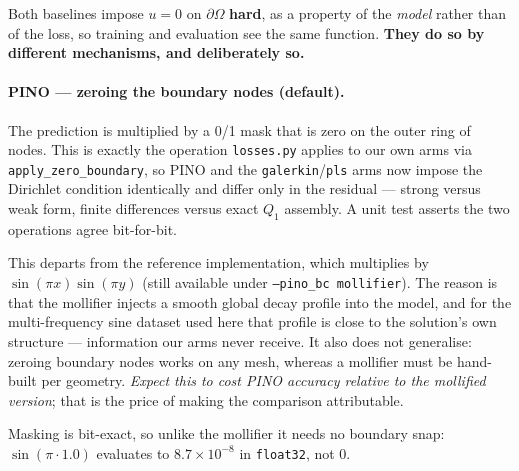 \documentclass[11pt]{article}
\begin{document}
Both baselines impose $u=0$ on $\partial\Omega$ \textbf{hard}, as a property of the \emph{model}
rather than of the loss, so training and evaluation see the same function. \textbf{They do so by
different mechanisms, and deliberately so.}

\paragraph{PINO --- zeroing the boundary nodes (default).} The prediction is multiplied by a
0/1 mask that is zero on the outer ring of nodes. This is exactly the operation
\texttt{losses.py} applies to our own arms via \texttt{apply\_zero\_boundary}, so PINO and the
\texttt{galerkin}/\texttt{pls} arms now impose the Dirichlet condition identically and differ only
in the residual --- strong versus weak form, finite differences versus exact $Q_1$ assembly.
A unit test asserts the two operations agree bit-for-bit.

This departs from the reference implementation, which multiplies by
$\sin(\pi x)\sin(\pi y)$ (still available under \texttt{--pino\_bc mollifier}). The reason is that
the mollifier injects a smooth global decay profile into the model, and for the multi-frequency
sine dataset used here that profile is close to the solution's own structure --- information our
arms never receive. It also does not generalise: zeroing boundary nodes works on any mesh, whereas
a mollifier must be hand-built per geometry. \emph{Expect this to cost PINO accuracy relative to
the mollified version}; that is the price of making the comparison attributable.

Masking is bit-exact, so unlike the mollifier it needs no boundary snap: $\sin(\pi\cdot 1.0)$
evaluates to $8.7\times10^{-8}$ in \texttt{float32}, not $0$.
\end{document}
